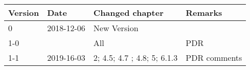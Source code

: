 \begin{longtable}{|p{1.5cm}|p{2cm}|p{6cm}|p{3cm}|}\hline
\centering
\textbf{Version} & \textbf{Date} & \textbf{Changed chapter} & \textbf{Remarks}  \\\hline
0       & 2018-12-06 	& New Version 	&          				\\\hline
1-0   	&  				& All         	& PDR      				\\\hline

1-1		& 2019-16-03	& 2; 4.5; 4.7 ; 4.8; 5; 6.1.3		& PDR comments 			\\\hline

\end{longtable}           